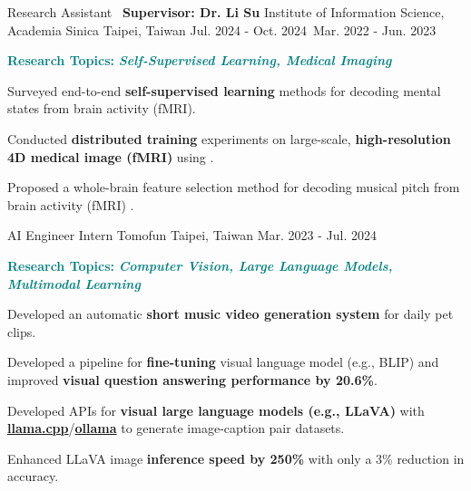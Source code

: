 \begin{cventries}
  \cventry
    {Research Assistant \newline~\textbf{Supervisor: Dr. Li Su}} %
    {Institute of Information Science, Academia Sinica} %
    {Taipei, Taiwan} %
    {Jul. 2024 - Oct. 2024\newline~Mar. 2022 - Jun. 2023} %
    {
        \begin{cvitems} %
            \item[] \footnotesize\textbf{\textcolor{teal}{Research Topics:}} \textit{\textcolor{teal}{\textbf{Self-Supervised Learning, Medical Imaging}}}
            \item {Surveyed end-to-end \textbf{self-supervised learning} methods for decoding mental states from brain activity (fMRI).}
            \item {Conducted \textbf{distributed training} experiments on large-scale, \textbf{high-resolution 4D medical image (fMRI)} using \href{https://www.twcc.ai/intro/HPC}{}.}
            \item {Proposed a whole-brain feature selection method for decoding musical pitch from brain activity (fMRI) \cite{ICASSP2023}.}
        \end{cvitems}
    }


  \cventry
    {AI Engineer Intern} %
    {Tomofun} %
    {Taipei, Taiwan} %
    {Mar. 2023 - Jul. 2024} %
    {
        \begin{cvitems} %
            \item[] \footnotesize\textbf{\textcolor{teal}{Research Topics:}} \textit{\textcolor{teal}{\textbf{Computer Vision, Large Language Models, Multimodal Learning}}}
            \item {Developed an automatic \textbf{short music video generation system} for daily pet clips.}
            \item Developed a pipeline for \textbf{fine-tuning} visual language model (e.g., BLIP) and improved \textbf{visual question answering performance by 20.6\%}.
            \item {Developed APIs for \textbf{visual large language models (e.g., LLaVA)} with \href{https://github.com/ggerganov/llama.cpp}{\color{orange}\textbf{llama.cpp}}/\href{https://ollama.com/library/llava}{\color{orange}\textbf{ollama}} to generate image-caption pair datasets.}
            \item {Enhanced LLaVA image \textbf{inference speed by 250\%} with only a 3\% reduction in accuracy.}
        \end{cvitems}
    }
    

\end{cventries}
